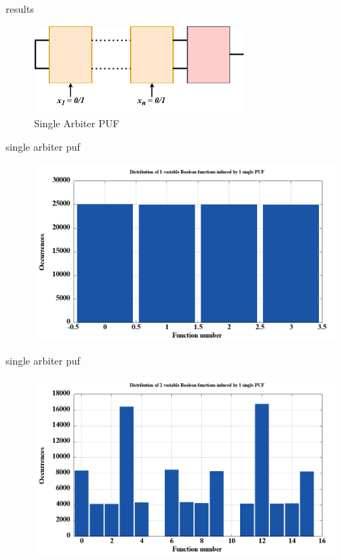 \documentclass[10pt, compress]{beamer}
\begin{document}
\begin{frame}{results}
    \begin{figure}
        \centering
        \includegraphics[width=0.7\textwidth]{figures/puf_1.pdf}
        \caption{Single Arbiter PUF}
    \end{figure}
\end{frame}

\begin{frame}{single arbiter puf}
    \begin{figure}
        \centering
        \includegraphics[width=\textwidth]{figures/dist/distribution_of_1-variable_boolean_functions_induced_by_1_single_puf.png}
    \end{figure}
\end{frame}

\begin{frame}{single arbiter puf}
    \begin{figure}
        \centering
        \includegraphics[width=\textwidth]{figures/dist/distribution_of_2-variable_boolean_functions_induced_by_1_single_puf.png}
    \end{figure}
\end{frame}
\end{document}
